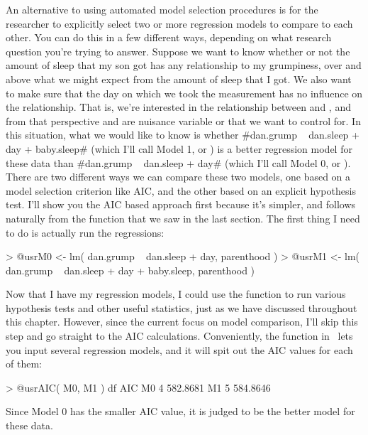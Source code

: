 An alternative to using automated model selection procedures is for the researcher to explicitly select two or more regression models to compare to each other. You can do this in a few different ways, depending on what research question you're trying to answer. Suppose we want to know whether or not the amount of sleep that my son got has any relationship to my grumpiness, over and above what we might expect from the amount of sleep that I got. We also want to make sure that the day on which we took the measurement has no influence on the relationship. That is, we're interested in the relationship between  and , and from that perspective  and  are nuisance variable or  that we want to control for. In this situation, what we would like to know is whether \rtextverb#dan.grump ~ dan.sleep + day + baby.sleep# (which I'll call Model 1, or ) is a better regression model for these data than \rtextverb#dan.grump ~ dan.sleep + day# (which I'll call Model 0, or ). There are two different ways we can compare these two models, one based on a model selection criterion like AIC, and the other based on an explicit hypothesis test. I'll show you the AIC based approach first because it's simpler, and follows naturally from the  function that we saw in the last section. The first thing I need to do is actually run the regressions:
\begin{rblock1}
> @usr{M0 <- lm( dan.grump ~ dan.sleep + day, parenthood )}
> @usr{M1 <- lm( dan.grump ~ dan.sleep + day + baby.sleep, parenthood )}
\end{rblock1}
Now that I have my regression models, I could use the  function to run various hypothesis tests and other useful statistics, just as we have discussed throughout this chapter. However, since the current focus on model comparison, I'll skip this step and go straight to the AIC calculations. Conveniently, the  function in \R\ lets you input several regression models, and it will spit out the AIC values for each of them:
\begin{rblock1}
> @usr{AIC( M0, M1 )}
   df      AIC
M0  4 582.8681
M1  5 584.8646
\end{rblock1}
Since Model 0 has the smaller AIC value, it is judged to be the better model for these data. 

